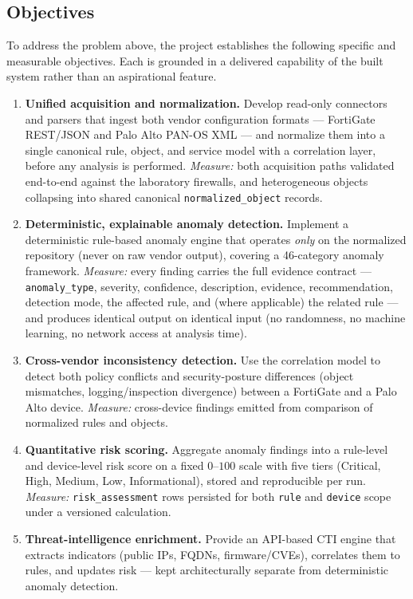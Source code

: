 \subsection{Objectives}
\label{sec:ch1-objectives}

To address the problem above, the project establishes the following specific and measurable objectives. Each is grounded in a delivered capability of the built system rather than an aspirational feature.

\begin{enumerate}[leftmargin=1.7em, label=\textbf{O\arabic*.}]
  \item \textbf{Unified acquisition and normalization.} Develop read-only connectors and parsers that ingest both vendor configuration formats --- FortiGate REST/JSON and Palo Alto PAN-OS XML --- and normalize them into a single canonical rule, object, and service model with a correlation layer, before any analysis is performed. \emph{Measure:} both acquisition paths validated end-to-end against the laboratory firewalls, and heterogeneous objects collapsing into shared canonical \texttt{normalized\_object} records.
  \item \textbf{Deterministic, explainable anomaly detection.} Implement a deterministic rule-based anomaly engine that operates \emph{only} on the normalized repository (never on raw vendor output), covering a 46-category anomaly framework. \emph{Measure:} every finding carries the full evidence contract --- \texttt{anomaly\_type}, severity, confidence, description, evidence, recommendation, detection mode, the affected rule, and (where applicable) the related rule --- and produces identical output on identical input (no randomness, no machine learning, no network access at analysis time).
  \item \textbf{Cross-vendor inconsistency detection.} Use the correlation model to detect both policy conflicts and security-posture differences (object mismatches, logging/inspection divergence) between a FortiGate and a Palo Alto device. \emph{Measure:} cross-device findings emitted from comparison of normalized rules and objects.
  \item \textbf{Quantitative risk scoring.} Aggregate anomaly findings into a rule-level and device-level risk score on a fixed $0$--$100$ scale with five tiers (Critical, High, Medium, Low, Informational), stored and reproducible per run. \emph{Measure:} \texttt{risk\_assessment} rows persisted for both \texttt{rule} and \texttt{device} scope under a versioned calculation.
  \item \textbf{Threat-intelligence enrichment.} Provide an API-based CTI engine that extracts indicators (public IPs, FQDNs, firmware/CVEs), correlates them to rules, and updates risk --- kept architecturally separate from deterministic anomaly detection.

\end{enumerate}
